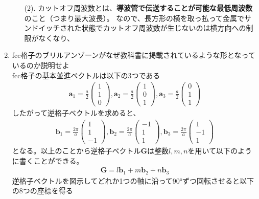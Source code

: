 \documentclass[a4paper,11pt,dvipdfmx]{jsarticle}
\begin{document}
\begin{enumerate}
\begin{itemize}
    \item[(2).] カットオフ周波数とは、\textbf{導波管で伝送することが可能な最低周波数}のこと（つまり最大波長）。
    なので、長方形の横を取っ払って金属でサンドイッチされた状態でカットオフ周波数が生じないのは横方向への制限がなくなり、
  \end{itemize}
  \item fcc格子のブリルアンゾーンがなぜ教科書に掲載されているような形となっているのか説明せよ
    \\ 
    fcc格子の基本並進ベクトルは以下の3つである
    \begin{align*}
      \boldsymbol{a}_1 = \frac{a}{2}\begin{pmatrix} 1 \\ 1 \\ 0\end{pmatrix}, 
      \boldsymbol{a}_2 = \frac{a}{2}\begin{pmatrix} 1 \\ 0 \\ 1\end{pmatrix}, 
      \boldsymbol{a}_3 = \frac{a}{2}\begin{pmatrix} 0 \\ 1 \\ 1\end{pmatrix}
    \end{align*}
    したがって逆格子ベクトルを求めると、
    \begin{align*}
      \boldsymbol{b}_1 = \frac{2 \pi}{a} \begin{pmatrix}1 \\ 1 \\ -1\end{pmatrix}, 
      \boldsymbol{b}_2 = \frac{2 \pi}{a} \begin{pmatrix}-1 \\ 1 \\ 1\end{pmatrix}, 
      \boldsymbol{b}_3 = \frac{2 \pi}{a} \begin{pmatrix}1 \\ -1 \\ 1\end{pmatrix}
    \end{align*}
    となる。以上のことから逆格子ベクトル$\boldsymbol{G}$は整数$l, m, n$を用いて以下のように書くことができる。
    \begin{align*}
      \boldsymbol{G} = l \boldsymbol{b}_1 + m \boldsymbol{b}_2 + n \boldsymbol{b}_3
    \end{align*}
    逆格子ベクトルを図示してどれか1つの軸に沿って90°ずつ回転させると以下の8つの座標を得る

\end{enumerate}
\end{document}
